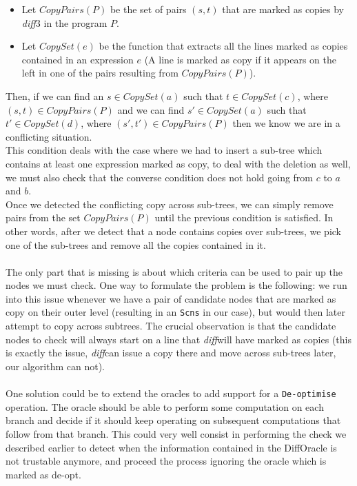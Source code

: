 \documentclass[11pt, titlepage]{article}
\newcommand{\diff}{\emph{diff}}
\begin{document}
\begin{itemize}
  \item Let $CopyPairs(P)$ be the set of pairs $(s,t)$ that are marked as copies by \diff3 in the program $P$.

\item Let $CopySet(e)$ be the function that extracts all the lines marked as copies 
contained in an expression $e$ (A line is marked as copy if it appears on the left in one of the pairs resulting from $CopyPairs(P)$).
\end{itemize}

Then, if we can find an $s \in CopySet(a)$ such that $t \in CopySet(c)$, where $(s,t) \in CopyPairs(P)$ and we can find $s' \in CopySet(a)$ such that $t' \in CopySet(d)$, where $(s',t') \in CopyPairs(P)$ then we know we are in a conflicting situation. 
\\
This condition deals with the case where we had to insert a sub-tree which 
contains at least one expression marked as copy, to deal with the deletion as well, we 
must also check that the converse condition does not hold going from $c$ to $a$ 
and $b$.
\\
Once we detected the conflicting copy across sub-trees, we can simply remove pairs from the set $CopyPairs(P)$ until the previous condition is satisfied. In other words, after we detect that a node contains copies over sub-trees, we pick one of the sub-trees and remove all the copies contained in it.
\\
\\
The only part that is missing is about which criteria can be used to pair up the nodes we must check. 
One way to formulate the problem is the following: we run into this issue whenever we have a pair of candidate nodes that are marked as copy on their outer level (resulting in an \texttt{Scns} in our case), but would then later attempt to copy across subtrees.  
The crucial observation is that the candidate nodes to check will always start on a line that \diff will have marked as copies (this is exactly the issue, \diff can issue a copy there and move across sub-trees later, our algorithm can not). 
\\
\\
One solution could be to extend the oracles to add support for a \texttt{De-optimise} operation. The oracle should be able to perform some computation on each branch 
and decide if it should keep operating on subsequent computations that follow from that branch.
This could very well consist in performing the check we described earlier to detect when the information contained in the DiffOracle is not trustable anymore, and proceed the process ignoring the oracle which is marked as de-opt. 
\end{document}
